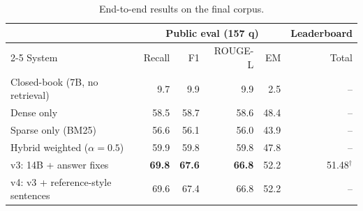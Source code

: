 \begin{table}[t]
  \centering
  \small
  \begin{tabular}{lrrrrr}
    \toprule
    & \multicolumn{4}{c}{Public eval (157 q)} & Leaderboard \\
    \cmidrule(lr){2-5}
    System & Recall & F1 & ROUGE-L & EM & Total \\
    \midrule
    Closed-book (7B, no retrieval) & 9.7 & 9.9 & 9.9 & 2.5 & -- \\
    Dense only & 58.5 & 58.7 & 58.6 & 48.4 & -- \\
    Sparse only (BM25) & 56.6 & 56.1 & 56.0 & 43.9 & -- \\
    Hybrid weighted ($\alpha=0.5$) & 59.9 & 59.8 & 59.8 & 47.8 & -- \\
    v3: 14B + answer fixes & \textbf{69.8} & \textbf{67.6} & \textbf{66.8} & 52.2 & 51.48$^\dagger$ \\
    v4: v3 + reference-style sentences & 69.6 & 67.4 & 66.8 & 52.2 & -- \\
    \bottomrule
  \end{tabular}
  \caption{End-to-end results on the final corpus.}
  \label{tab:results}
\end{table}
